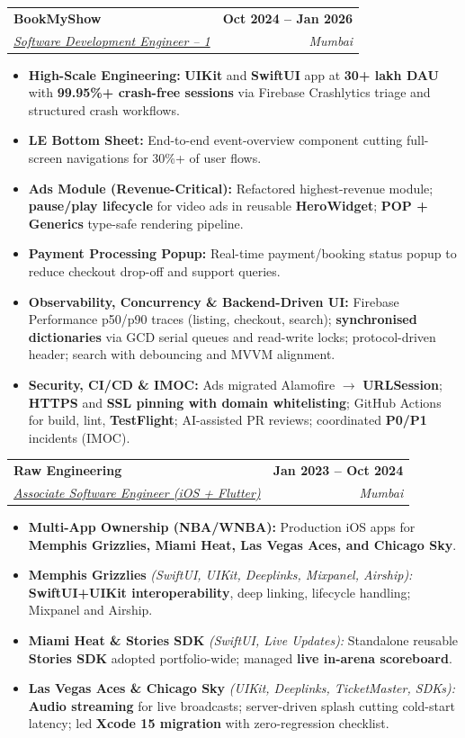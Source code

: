 \documentclass[letterpaper,11pt]{article}
\makeatletter
\newcommand{\resumeItem}[1]{%
  \item{#1}%
}
\newcommand{\resumeSubheading}[4]{%
  \vspace{3pt}\item
    \begin{tabular*}{1.0\textwidth}[t]{l@{\extracolsep{\fill}}r}
      \textbf{\large#1} & \textbf{#2} \\
      \textit{#3} & \textit{#4} \\
    \end{tabular*}\vspace{2.5pt}%
}
\newcommand{\resumeItemListStart}{%
  \begin{itemize}[topsep=0.5pt, itemsep=1pt, parsep=0pt, leftmargin=*]%
}
\newcommand{\resumeItemListEnd}{\end{itemize}\vspace{0pt}}
\makeatother
\begin{document}
\resumeSubheading
  {BookMyShow \href{https://in.bookmyshow.com/}{\faExternalLink*}}{Oct 2024 -- Jan 2026}
  {\underline{Software Development Engineer -- 1}}{Mumbai}
  \resumeItemListStart
    \resumeItem{\textbf{High-Scale Engineering:} \textbf{UIKit} and \textbf{SwiftUI} app at \textbf{30+ lakh DAU} with \textbf{99.95\%+ crash-free sessions} via Firebase Crashlytics triage and structured crash workflows.}
    \resumeItem{\textbf{LE Bottom Sheet:} End-to-end event-overview component cutting full-screen navigations for 30\%+ of user flows.}
    \resumeItem{\textbf{Ads Module (Revenue-Critical):} Refactored highest-revenue module; \textbf{pause/play lifecycle} for video ads in reusable \textbf{HeroWidget}; \textbf{POP + Generics} type-safe rendering pipeline.}
    \resumeItem{\textbf{Payment Processing Popup:} Real-time payment/booking status popup to reduce checkout drop-off and support queries.}
    \resumeItem{\textbf{Observability, Concurrency \& Backend-Driven UI:} Firebase Performance p50/p90 traces (listing, checkout, search); \textbf{synchronised dictionaries} via GCD serial queues and read-write locks; protocol-driven header; search with debouncing and MVVM alignment.}
    \resumeItem{\textbf{Security, CI/CD \& IMOC:} Ads migrated Alamofire $\rightarrow$ \textbf{URLSession}; \textbf{HTTPS} and \textbf{SSL pinning with domain whitelisting}; GitHub Actions for build, lint, \textbf{TestFlight}; AI-assisted PR reviews; coordinated \textbf{P0/P1} incidents (IMOC).}
  \resumeItemListEnd

\resumeSubheading
  {Raw Engineering \href{https://www.raweng.com/}{\faExternalLink*}}{Jan 2023 -- Oct 2024}
  {\underline{Associate Software Engineer (iOS + Flutter)}}{Mumbai}
  \resumeItemListStart
    \resumeItem{\textbf{Multi-App Ownership (NBA/WNBA):} Production iOS apps for \textbf{Memphis Grizzlies, Miami Heat, Las Vegas Aces, and Chicago Sky}.}
    \resumeItem{\textbf{Memphis Grizzlies} \textit{(SwiftUI, UIKit, Deeplinks, Mixpanel, Airship):} \textbf{SwiftUI+UIKit interoperability}, deep linking, lifecycle handling; Mixpanel and Airship.}
    \resumeItem{\textbf{Miami Heat \& Stories SDK} \textit{(SwiftUI, Live Updates):} Standalone reusable \textbf{Stories SDK} adopted portfolio-wide; managed \textbf{live in-arena scoreboard}.}
    \resumeItem{\textbf{Las Vegas Aces \& Chicago Sky} \textit{(UIKit, Deeplinks, TicketMaster, SDKs):} \textbf{Audio streaming} for live broadcasts; server-driven splash cutting cold-start latency; led \textbf{Xcode 15 migration} with zero-regression checklist.}
  \resumeItemListEnd
\end{document}
